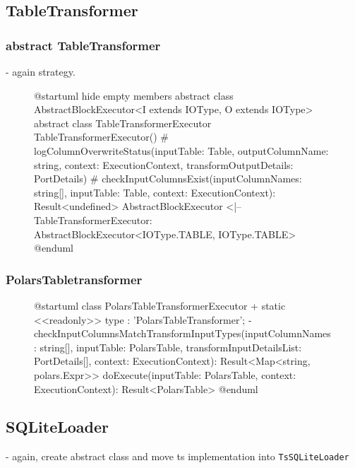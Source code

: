 \subsection{TableTransformer}
\subsubsection{abstract TableTransformer}
- again strategy.
\begin{figure}
	\begin{plantuml}
		@startuml
		hide empty members
		abstract class AbstractBlockExecutor<I extends IOType, O extends IOType>
		abstract class TableTransformerExecutor {
				TableTransformerExecutor()
				# logColumnOverwriteStatus(inputTable: Table, outputColumnName: string, context: ExecutionContext, transformOutputDetails: PortDetails)
				# checkInputColumnsExist(inputColumnNames: string[], inputTable: Table, context: ExecutionContext): Result<undefined>
			}
		AbstractBlockExecutor <|-- TableTransformerExecutor: AbstractBlockExecutor<IOType.TABLE, IOType.TABLE>
		@enduml
	\end{plantuml}
	\caption{}
	\label{fig:uml:tabletransformer}
\end{figure}
\subsubsection{PolarsTabletransformer}
\begin{figure}
	\begin{plantuml}
		@startuml
		class PolarsTableTransformerExecutor  {
		+ {static} <<readonly>> type : 'PolarsTableTransformer';
		- checkInputColumnsMatchTransformInputTypes(inputColumnNames: string[], inputTable: PolarsTable, transformInputDetailsList: PortDetails[], context: ExecutionContext): Result<Map<string, polars.Expr>>
		doExecute(inputTable: PolarsTable, context: ExecutionContext): Result<PolarsTable>
		}
		@enduml
	\end{plantuml}
	\caption{}
	\label{fig:uml:polarstabletransformer}
\end{figure}

\subsection{SQLiteLoader}
- again, create abstract class and move ts implementation into \Verb|TsSQLiteLoader|

